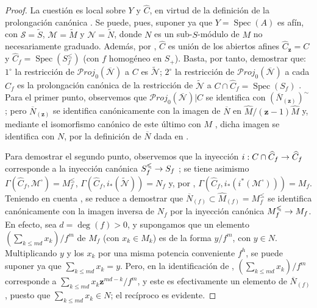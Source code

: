 \documentclass[oneside,10pt]{amsart}
\makeatletter
\renewcommand{\leq}{\leqslant}
\newcommand{\ega@arrow}[2]{\mathchoice{#1}{#2}{#2}{#2}}
\renewcommand{\to}{\ega@arrow{\longrightarrow}{\rightarrow}}
\makeatother
\begin{document}
\begin{proof}
La cuestión es local sobre $Y$ y $\widehat{C}$, en virtud de la definición de la prolongación canónica .
Se puede, pues, suponer ya que $Y=\operatorname{Spec}(A)$ es afín, con $\mathcal{S}=\widetilde{S}$, $\mathcal{M}=\widetilde{M}$ y $\mathcal{N}=\widetilde{N}$, donde $N$ es un sub-$S$-módulo de $M$ no necesariamente graduado.
Además, por , $\widehat{C}$ es unión de los abiertos afines $\widehat{C}_{\mathbf{z}}=C$ y $\widehat{C}_f=\operatorname{Spec}(S_f^{\leq})$ (con $f$ homogéneo en $S_+$).
Basta, por tanto, demostrar que: $1^\circ$ la restricción de $\mathcal{P}\mathit{roj}_0(\overline{\mathcal{N}})$ a $C$ es $\widetilde{\mathcal{N}}$; $2^\circ$ la restricción de $\mathcal{P}\mathit{roj}_0(\overline{\mathcal{N}})$ a cada $\widehat{C}_f$ es la prolongación canónica de la restricción de $\widetilde{\mathcal{N}}$ a $C\cap\widehat{C}_f=\operatorname{Spec}(S_f)$ .
Para el primer punto, observemos que $\mathcal{P}\mathit{roj}_0(\overline{\mathcal{N}})|C$ se identifica con $(\overline{N}_{(\mathbf{z})})^{\sim}$ ;
pero $\overline{N}_{(\mathbf{z})}$ se identifica canónicamente  con la imagen de $\overline{N}$ en $\widehat{M}/(\mathbf{z}-1)\widehat{M}$ y, mediante el isomorfismo canónico de este último con $M$ , dicha imagen se identifica con $N$, por la definición de $\overline{N}$ dada en .

Para demostrar el segundo punto, observemos que la inyección $i:C\cap\widehat{C}_f\to\widehat{C}_f$ corresponde a la inyección canónica $S_f^{\leq}\to S_f$ ;
se tiene asimismo $\Gamma(\widehat{C}_f,\mathcal{M}^{\square})=M_f^{\leq}$, $\Gamma(\widehat{C}_f,i_*(\widetilde{\mathcal{N}}))=N_f$ y, por , $\Gamma(\widehat{C}_f,i_*(i^*(\mathcal{M}^{\square})))=M_f$.
Teniendo en cuenta , se reduce a demostrar que $\overline{N}_{(f)}\subset\widehat{M}_{(f)}=M_f^{\leq}$ se identifica canónicamente con la imagen inversa de $N_f$ por la inyección canónica $M_f^{\leq}\to M_f$.
En efecto, sea $d=\deg(f)>0$, y supongamos que un elemento $(\sum_{k\leqslant md}x_k)/f^m$ de $M_f$ (con $x_k\in M_k$) es de la forma $y/f^m$, con $y\in N$.
Multiplicando $y$ y los $x_k$ por una misma potencia conveniente $f^h$, se puede suponer ya que $\sum_{k\leqslant md}x_k=y$.
Pero, en la identificación de , $(\sum_{k\leqslant md}x_k)/f^m$ corresponde a $\sum_{k\leqslant md}x_k\mathbf{z}^{md-k}/f^m$, y este es efectivamente un elemento de $\overline{N}_{(f)}$, puesto que $\sum_{k\leqslant md}x_k\in N$;
el recíproco es evidente.
\end{proof}
\end{document}
